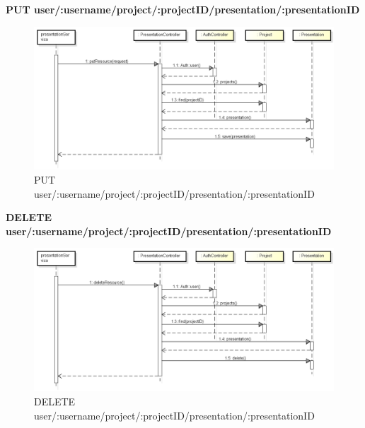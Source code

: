 \textbf{PUT user/:username/project/:projectID/presentation/:presentationID}
\begin{figure}[h]
	\centering
	\includegraphics[width=0.6\linewidth]{img/PUTpresentation}
	\caption[PUT user/:username/project/:projectID/presentation/:presentationID]{PUT user/:username/project/:projectID/presentation/:presentationID}
	\label{fig:PUT user/:username/project/:projectID/presentation/:presentationID}
\end{figure}

\newpage

\textbf{DELETE user/:username/project/:projectID/presentation/:presentationID}
\begin{figure}[h]
	\centering
	\includegraphics[width=0.6\linewidth]{img/DELETEpresentation}
	\caption[DELETE user/:username/project/:projectID/presentation/:presentationID]{DELETE user/:username/project/:projectID/presentation/:presentationID}
	\label{fig:DELETE user/:username/project/:projectID/presentation/presentationID}
\end{figure}
